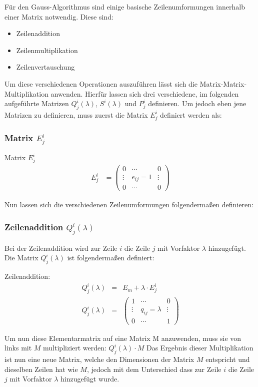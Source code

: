 
Für den Gauss-Algorithmus sind einige basische Zeilenumformungen innerhalb einer Matrix notwendig. Diese sind:

\begin{itemize}
\item Zeilenaddition
\item Zeilenmultiplikation
\item Zeilenvertauschung
\end{itemize}

Um diese verschiedenen Operationen auszuführen lässt sich die Matrix-Matrix-Multiplikation anwenden. Hierfür lassen sich drei verschiedene, im folgenden aufgeführte Matrizen $Q^i_j(\lambda)$, $S^i(\lambda)$ und $P^i_j$ definieren.
Um jedoch eben jene Matrizen zu definieren, muss zuerst die Matrix $E^i_j$ definiert werden als:

\subsubsection{Matrix $E^i_j$}
\begin{Def} Matrix $E^i_j$
\begin{align*}
 	E^i_j &=
	 	\begin{pmatrix}
	 	0 & \cdots & 0 \\
	 	\vdots & e_{ij} = 1 & \vdots \\
	 	0 & \cdots & 0 
 	\end{pmatrix}
\end{align*}
\end{Def}

\vspace{8pt}

\raggedright Nun lassen sich die verschiedenen Zeilenumformungen folgendermaßen definieren:
\subsubsection{Zeilenaddition $Q^i_j(\lambda)$}
Bei der Zeilenaddition wird zur Zeile $i$ die Zeile $j$ mit Vorfaktor $\lambda$ hinzugefügt.
Die Matrix $Q^i_j(\lambda)$ ist folgendermaßen definiert:
\begin{Def} Zeilenaddition:
\begin{align*}
	Q^i_j(\lambda) & = & E_m + \lambda \cdot E^i_j \\
	Q^i_j(\lambda) & = & 
	\begin{pmatrix}
	1 & \cdots & 0 \\ 
	\vdots &  q_{ij} = \lambda & \vdots \\  
	0 & \cdots & 1
	\end{pmatrix} 
\end{align*}
\end{Def}
\raggedright
Um nun diese Elementarmatrix auf eine Matrix M anzuwenden, muss sie von links mit $M$ multipliziert werden: $Q^i_j(\lambda) \cdot M$
Das Ergebnis dieser Multiplikation ist nun eine neue Matrix, welche den Dimensionen der Matrix $M$ entspricht und dieselben Zeilen hat wie $M$, jedoch mit dem Unterschied dass zur Zeile $i$ die Zeile $j$ mit Vorfaktor $\lambda$ hinzugefügt wurde.

